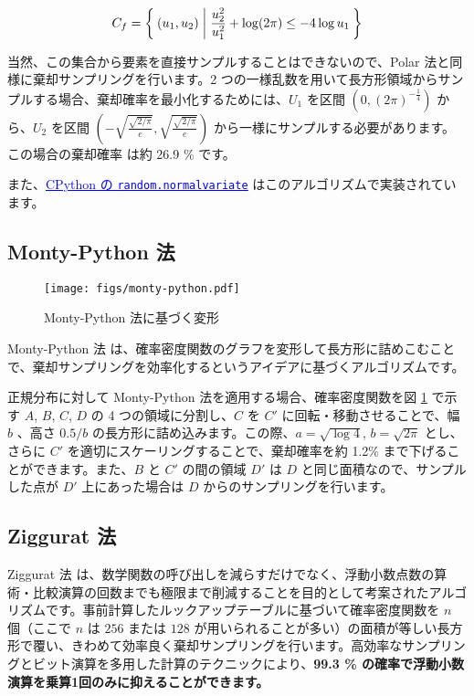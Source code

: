 \documentclass[twocolumn, dvipdfmx]{jsarticle}
\begin{document}
\begin{align*}
    C_f = \Set{ (u_1, u_2) | \frac{u_2^2}{u_1^2} + \log (2 \pi) \leq -4 \log u_1 }
\end{align*}

当然、この集合から要素を直接サンプルすることはできないので、Polar 法と同様に棄却サンプリングを行います。2 つの一様乱数を用いて長方形領域からサンプルする場合、棄却確率を最小化するためには、$U_1$ を区間 $\left(0, (2 \pi)^{-\frac{1}{4}}\right)$ から、$U_2$ を区間 $\left(-\sqrt{\frac{\sqrt{2 / \pi}}{e}}, \sqrt{\frac{\sqrt{2 / \pi}}{e}}\right)$ から一様にサンプルする必要があります。この場合の棄却確率 は約 26.9 \% です。

また、\href{https://github.com/python/cpython/blob/b0dfc7581697f20385813582de7e92ba6ba0105f/Lib/random.py#L529-L548}{\textcolor{blue}{\underline{CPython の \texttt{random.normalvariate}}}} はこのアルゴリズムで実装されています。

\subsection*{Monty-Python 法}

\begin{figure}[t]
    \centering
    \texttt{[image: figs/monty-python.pdf]}
    \caption{Monty-Python 法に基づく変形}
    \label{fig:monty-python-plot}
\end{figure}

Monty-Python 法 \cite{marsaglia1998monty} は、確率密度関数のグラフを変形して長方形に詰めこむことで、棄却サンプリングを効率化するというアイデアに基づくアルゴリズムです。

正規分布に対して Monty-Python 法を適用する場合、確率密度関数を図 \ref{fig:monty-python-plot} で示す $A$, $B$, $C$, $D$ の 4 つの領域に分割し、$C$ を $C'$ に回転・移動させることで、幅 $b$ 、高さ $0.5/b$ の長方形に詰め込みます。この際、$a = \sqrt{\log 4}$, $b = \sqrt{2 \pi}$ とし、さらに $C'$ を適切にスケーリングすることで、棄却確率を約 1.2\% まで下げることができます。また、$B$ と $C'$ の間の領域 $D'$ は $D$ と同じ面積なので、サンプルした点が $D'$ 上にあった場合は $D$ からのサンプリングを行います。

\subsection*{Ziggurat 法}

Ziggurat 法 \cite{marsaglia1984fast, marsaglia2000ziggurat} は、数学関数の呼び出しを減らすだけでなく、浮動小数点数の算術・比較演算の回数までも極限まで削減することを目的として考案されたアルゴリズムです。事前計算したルックアップテーブルに基づいて確率密度関数を $n$ 個（ここで $n$ は $256$ または $128$ が用いられることが多い）の面積が等しい長方形で覆い、きわめて効率良く棄却サンプリングを行います。高効率なサンプリングとビット演算を多用した計算のテクニックにより、\textbf{99.3 \% の確率で浮動小数演算を乗算1回のみに抑えることができます。}
\end{document}
